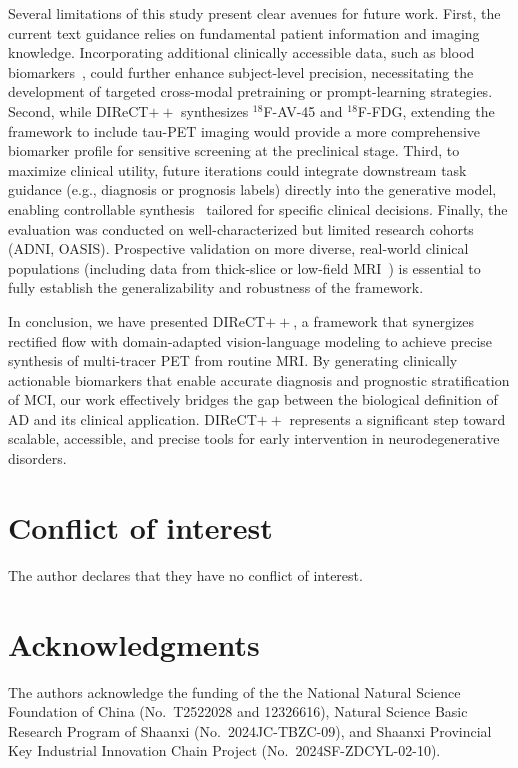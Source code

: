 \documentclass[a4paper]{cas-sc}
\begin{document}
Several limitations of this study present clear avenues for future work. First, the current text guidance relies on fundamental patient information and imaging knowledge. Incorporating additional clinically accessible data, such as blood biomarkers~\citep{hansson2023blood}, could further enhance subject-level precision, necessitating the development of targeted cross-modal pretraining or prompt-learning strategies. Second, while DIReCT$++$ synthesizes $^{18}$F-AV-45 and $^{18}$F-FDG, extending the framework to include tau-PET imaging would provide a more comprehensive biomarker profile for sensitive screening at the preclinical stage. Third, to maximize clinical utility, future iterations could integrate downstream task guidance (e.g., diagnosis or prognosis labels) directly into the generative model, enabling controllable synthesis~\citep{wang2025flexibly,chang2025controllable} tailored for specific clinical decisions. Finally, the evaluation was conducted on well-characterized but limited research cohorts (ADNI, OASIS). Prospective validation on more diverse, real-world clinical populations (including data from thick-slice or low-field MRI~\citep{sorby2024portable}) is essential to fully establish the generalizability and robustness of the framework.

In conclusion, we have presented DIReCT$++$, a framework that synergizes rectified flow with domain-adapted vision-language modeling to achieve precise synthesis of multi-tracer PET from routine MRI. By generating clinically actionable biomarkers that enable accurate diagnosis and prognostic stratification of MCI, our work effectively bridges the gap between the biological definition of AD and its clinical application. DIReCT$++$ represents a significant step toward scalable, accessible, and precise tools for early intervention in neurodegenerative disorders.

\printcredits

\section*{Conflict of interest}
The author declares that they have no conflict of interest.


\section*{Acknowledgments}
The authors acknowledge the funding of the the National Natural Science Foundation of China (No.~T2522028 and 12326616), Natural Science Basic Research Program of Shaanxi (No.~2024JC-TBZC-09), and Shaanxi Provincial Key Industrial Innovation Chain Project (No.~2024SF-ZDCYL-02-10).
\end{document}
